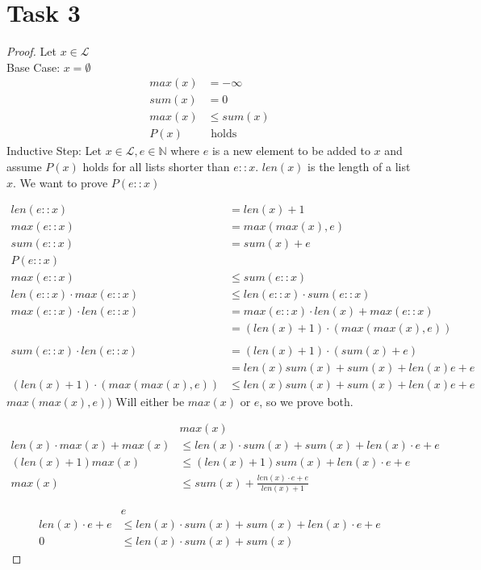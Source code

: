 \documentclass{article}
\begin{document}
	\section{Task 3}
	\begin{proof} 
		Let $x \in \mathcal{L}$ \\
		Base Case: 
		$x = \emptyset$
		\begin{align*}
			max(x) &= -\infty \\
			sum(x) &= 0 \\
			max(x) &\leq sum(x) \\ 
			P(x) &\text{  holds} 
		\end{align*}
		\noindent Inductive Step:
		Let $x \in \mathcal{L}, e \in \mathbb{N}$ where $e$ is a new element to be added to $x$ and assume $P(x)$ holds for all lists shorter than $e::x$. $len(x)$ is the length of a list $x$. We want to prove $P(e::x)$
		
		\begin{align*}
			len(e::x) &= len(x) + 1 \\
			max(e::x) &= max(max(x), e) \\
			sum(e::x) &= sum(x) + e \\
			P(e::x)& \\
			max(e::x) &\leq sum(e::x) \\
			len(e::x) \cdot max(e::x) &\leq len(e::x) \cdot sum(e::x) \\
			max(e::x)\cdot len(e::x) &= max(e::x) \cdot len(x) + max(e::x) \\
			&= (len(x) + 1)\cdot (max(max(x),e)) \\
			& \\
			sum(e::x) \cdot len(e::x) &= (len(x) + 1 ) \cdot (sum(x) + e) \\
			&= len(x)sum(x) + sum(x) + len(x)e + e \\
			(len(x) + 1)\cdot (max(max(x),e)) &\leq len(x)sum(x) + sum(x) + len(x)e + e
		\end{align*}
		$max(max(x),e))$ Will either be $max(x)$ or $e$, so we prove both.
		
		\begin{align*}
			&max(x) \\
			len(x)\cdot max(x) + max(x) &\leq len(x) \cdot sum(x) + sum(x) + len(x) \cdot e + e \\
			(len(x) + 1)max(x) &\leq (len(x) + 1)sum(x) + len(x) \cdot e + e  \\
			max(x) &\leq sum(x) + \frac{len(x) \cdot e + e}{len(x) + 1}
		\end{align*}
		
		\begin{align*}
			&e \\
			len(x)\cdot e + e &\leq len(x) \cdot sum(x) + sum(x) + len(x) \cdot e + e \\
			0 &\leq len(x) \cdot sum(x) + sum(x)
		\end{align*}
	\end{proof}
	
\end{document}
